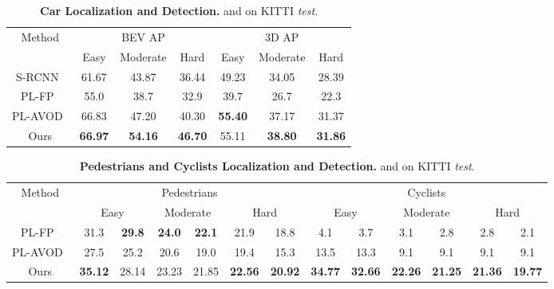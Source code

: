 \documentclass[letterpaper, 10 pt, conference]{ieeeconf}
\begin{document}
\begin{table*}[t!]
	\small
	\centering
	
	\begin{tabular}{|c||ccc||ccc|}
		\hline
		\multirow{2}{*}{Method} & \multicolumn{3}{c||}{BEV AP} & \multicolumn{3}{c|}{3D AP} \\
		            &    Easy & Moderate &  Hard &  Easy & Moderate &  Hard \\ \hline
		S-RCNN~\cite{li2019stereo_rcnn} & 61.67 & 43.87 & 36.44 &  49.23 & 34.05 & 28.39 \\ \hline
		PL-FP~\cite{wang2018pseudo}   & 55.0 & 38.7 & 32.9 & 39.7 & 26.7 & 22.3 \\
		PL-AVOD~\cite{wang2018pseudo} & 66.83 & 47.20 & 40.30 &  \textbf{55.40} & 37.17 & 31.37 \\
		\hline
		Ours   & \textbf{66.97} & \textbf{54.16} & \textbf{46.70} & 55.11 & \textbf{38.80} & \textbf{31.86} \\ \hline
	\end{tabular}
	\caption{\textbf{Car Localization and Detection.} \emph{} and \emph{} on KITTI \emph{test}.}
	\label{tab:kitti_test_cars}
\end{table*}

\begin{table*}[t!]
	\small
	\centering
	\tabcolsep=0.13cm
	\begin{tabular}{|c||c@{~/~}cc@{~/~}cc@{~/~}c||c@{~/~}cc@{~/~}cc@{~/~}c|}
		\hline
		\multirow{2}{*}{Method}  & \multicolumn{6}{c||}{Pedestrians} & \multicolumn{6}{c|}{Cyclists} \\
		&
		\multicolumn{2}{c}{Easy} & \multicolumn{2}{c}{Moderate} & \multicolumn{2}{c||}{Hard} &
		\multicolumn{2}{c}{Easy} & \multicolumn{2}{c}{Moderate} & \multicolumn{2}{c|}{Hard} \\ \hline
		PL-FP~\cite{wang2018pseudo} & 31.3 & \textbf{29.8} & \textbf{24.0} & \textbf{22.1} & 21.9 & 18.8 & 4.1 & 3.7 & 3.1 & 2.8 & 2.8 & 2.1 \\
		PL-AVOD~\cite{wang2018pseudo} & 27.5 & 25.2 & 20.6 & 19.0 & 19.4 & 15.3 & 13.5 & 13.3 & 9.1 & 9.1 & 9.1 & 9.1 \\
		\hline
		Ours  & \textbf{35.12} & 28.14 & 23.23 & 21.85 & \textbf{22.56} & \textbf{20.92} & \textbf{34.77} & \textbf{32.66} & \textbf{22.26} & \textbf{21.25} & \textbf{21.36} & \textbf{19.77}  \\
		\hline
	\end{tabular}
	\caption{\textbf{Pedestrians and Cyclists Localization and Detection.} \emph{} and \emph{} on KITTI \textit{test}.}
	\label{tab:kitti_test_ped_cyc}
\end{table*}
\end{document}
